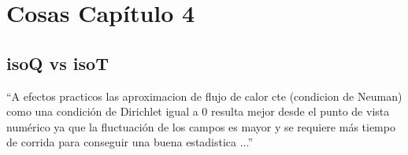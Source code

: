 \chapter{Cosas Capítulo 4} \label{apen:flageul}

\section{isoQ vs isoT}

``A efectos practicos las aproximacion de flujo de calor cte (condicion de Neuman) como una condición de Dirichlet igual a 0 resulta mejor desde el punto de vista numérico ya que la fluctuación de los campos es mayor y se requiere más tiempo de corrida para conseguir una buena estadistica ...''

\begin{figure}[H]
  \centering  
  \caption{}
  \label{fig:flageul}
\end{figure}

